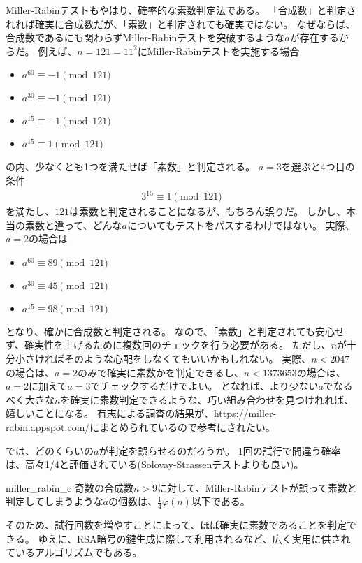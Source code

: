 Miller-Rabinテストもやはり、確率的な素数判定法である。
「合成数」と判定されれば確実に合成数だが、「素数」と判定されても確実ではない。
なぜならば、合成数であるにも関わらずMiller-Rabinテストを突破するような$a$が存在するからだ。
例えば、$n=121=11^2$にMiller-Rabinテストを実施する場合
\begin{itemize}
\item $a^{60} \equiv -1 \pmod{121}$
\item $a^{30} \equiv -1 \pmod{121}$
\item $a^{15} \equiv -1 \pmod{121}$
\item $a^{15} \equiv 1 \pmod{121}$
\end{itemize}
の内、少なくとも1つを満たせば「素数」と判定される。
$a=3$を選ぶと4つ目の条件
\begin{align*}
3^{15} \equiv 1 \pmod{121}
\end{align*}
を満たし、$121$は素数と判定されることになるが、もちろん誤りだ。
しかし、本当の素数と違って、どんな$a$についてもテストをパスするわけではない。
実際、$a=2$の場合は
\begin{itemize}
\item $a^{60} \equiv 89 \pmod{121}$
\item $a^{30} \equiv 45 \pmod{121}$
\item $a^{15} \equiv 98 \pmod{121}$
\end{itemize}
となり、確かに合成数と判定される。
なので、「素数」と判定されても安心せず、確実性を上げるために複数回のチェックを行う必要がある。
ただし、$n$が十分小さければそのような心配をしなくてもいいかもしれない。
実際、$n<2047$の場合は、$a=2$のみで確実に素数かを判定できるし、$n<1373653$の場合は、$a=2$に加えて$a=3$でチェックするだけでよい。
となれば、より少ない$a$でなるべく大きな$n$を確実に素数判定できるような、巧い組み合わせを見つけれれば、嬉しいことになる。
有志による調査の結果が、\url{https://miller-rabin.appspot.com/}にまとめられているので参考にされたい。



では、どのくらいの$a$が判定を誤らせるのだろうか。
1回の試行で間違う確率は、高々1/4と評価されている(Solovay-Strassenテストよりも良い)。

\begin{Prop}{}{miller_rabin_c}
奇数の合成数$n>9$に対して、Miller-Rabinテストが誤って素数と判定してしまうような$a$の個数は、$\frac{1}{4}\varphi(n)$以下である。
\end{Prop}

そのため、試行回数を増やすことによって、ほぼ確実に素数であることを判定できる。
ゆえに、RSA暗号の鍵生成に際して利用されるなど、広く実用に供されているアルゴリズムでもある。

